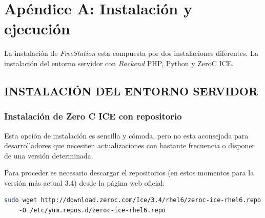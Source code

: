 
\newpage

    
    
    \appendix
    
    \clearpage %
    \addappheadtotoc
    \appendixpage

    
    \chapter{Apéndice A: Instalación y ejecución}
    
    La instalación de \emph{FreeStation} esta compuesta por dos instalaciones
    diferentes. La instalación del entorno servidor con \emph{Backend} PHP, Python y ZeroC ICE.
    
    \section{\uppercase{Instalación del entorno servidor}}
    
    \subsection{Instalación de Zero C ICE con repositorio}
    
    Esta opción de instalación es sencilla y cómoda, pero no esta aconsejada
    para desarrolladores que necesiten actualizaciones con bastante frecuencia o
    disponer de una versión determinada.

    Para proceder es necesario descargar el repositorios (en estos momentos
    para la versión más actual 3.4) desde la página web oficial:

    \begin{lstlisting}[language={bash}, texcl=true, caption={Añadir repositorio
    ICE}] sudo wget http://download.zeroc.com/Ice/3.4/rhel6/zeroc-ice-rhel6.repo
    -O /etc/yum.repos.d/zeroc-ice-rhel6.repo
    \end{lstlisting}
    
